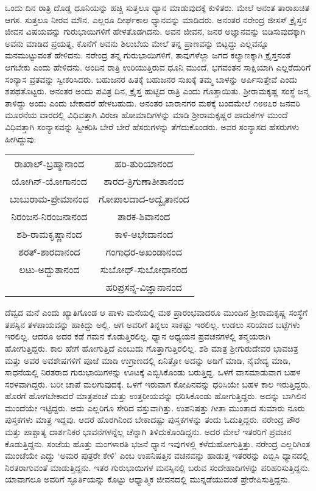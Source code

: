 ಒಂದು ದಿನ ರಾತ್ರಿ ದೊಡ್ಡ ಧೂನಿಯನ್ನು ಹಚ್ಚಿ ಸುತ್ತಲೂ ಧ್ಯಾನ ಮಾಡುವುದಕ್ಕೆ ಕುಳಿತರು. ಮೇಲೆ ಅನಂತ ತಾರಾಖಚಿತ ಆಗಸ. ಸುತ್ತಲೂ ನೀರವ ಮೌನ. ಎಲ್ಲರೂ ದೀರ್ಘಕಾಲ ಧ್ಯಾನವನ್ನು ಮಾಡಿದರು. ಅನಂತರ ನರೇಂದ್ರ ಜೀಸಸ್ ಕ್ರೈಸ್ತನ ಜೀವನ ವಿಷಯವನ್ನು ಗುರುಭಾಯಿಗಳಿಗೆ ಹೇಳತೊಡಗಿದನು. ಅವನ ಜೀವನ, ಜನರ ಅಜ್ಞಾನವನ್ನು ಬಿಡಿಸುವುದಕ್ಕಾಗಿ ಅವನು ಮಾಡಿದ ಪ್ರಯತ್ನ, ಕೊನೆಗೆ ಅವನು ಶಿಲುಬೆಯ ಮೇಲೆ ತನ್ನ ಪ್ರಾಣವನ್ನು ಬಿಟ್ಟದ್ದು ಎಲ್ಲವನ್ನೂ ಮನಮುಟ್ಟುವಂತೆ ಹೇಳಿದನು. ನರೇಂದ್ರ ತನ್ನ ಗುರುಭಾಯಿಗಳಿಗೆ, ತಾವುಗಳೆಲ್ಲಾ ಜಗದ ಕಲ್ಯಾಣಕ್ಕಾಗಿ ಕ್ರೈಸ್ತನಂತೆ ಆಗಬೇಕು ಎಂದು ಹೇಳಿದನು. ಅಂದಿನ ರಾತ್ರಿ ಉರಿಯುತ್ತಿರುವ ಧೂನಿ ಮುಂದೆ, ಭಗವಂತನ ಸಾಕ್ಷಿಯಾಗಿ ಎಲ್ಲರೆದುರಿಗೆ ಸಂನ್ಯಾಸ ವ್ರತವನ್ನು ಸ್ವೀಕರಿಸಿದರು. ಬಹುಜನರ ಹಿತಕ್ಕೆ ಬಹುಜನರ ಸುಖಕ್ಕೆ ತಮ್ಮ ಬಾಳನ್ನು ಅರ್ಪಿಸುತ್ತೇವೆ ಎಂದು ಶಪಥತೊಟ್ಟರು. ಅನಂತರ ಅಂದು ಪವಿತ್ರ ದಿನ, ಕ್ರೈಸ್ತ ಹುಟ್ಟಿದ ರಾತ್ರಿ ಎಂದು ಗೊತ್ತಾಯಿತು. ಶ‍್ರೀರಾಮಕೃಷ್ಣ ಸಂಸ್ಥೆ ಜನ್ಮ ತಾಳಿದ್ದು ಅಂದು ಎಂದು ಬೇಕಾದರೆ ಹೇಳಬಹುದು. ಅನಂತರ ಬಾರಾನಗರ ಮಠಕ್ಕೆ ಬಂದಮೇಲೆ ೧೮೮೭ರ ಜನವರಿ ಮೂರನೆಯ ವಾರದಲ್ಲಿ ವಿಧಿವತ್ತಾಗಿ ವಿರಜಾ ಹೋಮಾದಿಗಳನ್ನು ಮಾಡಿ ಶ‍್ರೀರಾಮಕೃಷ್ಣರ ಪಾದುಕೆಗಳ ಮುಂದೆ ವಿಧಿವತ್ತಾಗಿ ಸಂನ್ಯಾಸವನ್ನು ಸ್ವೀಕರಿಸಿ ಬೇರೆ ಬೇರೆ ಹೆಸರುಗಳನ್ನು ತೆಗೆದುಕೊಂಡರು. ಅವರ ಸಂನ್ಯಾಸದ ಹೆಸರುಗಳು ಹೀಗಿದ್ದುವು:
\begin{center}
\begin{tabular}{cc}
ರಾಖಾಲ್-ಬ್ರಹ್ಮಾನಾಂದ & ಹರಿ-ತುರಿಯಾನಂದ\\
ಯೋಗಿನ್-ಯೋಗಾನಂದ & ಶಾರದ-ತ್ರಿಗುಣಾತೀತಾನಂದ\\
ಬಾಬುರಾಮ-ಪ್ರೇಮಾನಂದ & ಗೋಪಾಲದಾದ-ಅದ್ವೈತಾನಂದ\\
ನಿರಂಜನ-ನಿರಂಜನಾನಂದ & ತಾರಕ-ಶಿವಾನಂದ\\
ಶಶಿ-ರಾಮಕೃಷ್ಣಾನಂದ & ಕಾಳಿ-ಅಭೇದಾನಂದ\\
ಶರತ್-ಶಾರದಾನಂದ & ಗಂಗಾಧರ-ಅಖಂಡಾನಂದ\\
ಲಟು-ಅದ್ಭುತಾನಂದ & ಸುಬೋಧ್-ಸುಬೋಧಾನಂದ\\
 & ಹರಿಪ್ರಸನ್ನ-ವಿಜ್ಞಾನಾನಂದ\\
\end{tabular}
\end{center}

ದೆವ್ವದ ಮನೆ ಎಂದು ಖ್ಯಾತಿಗೊಂಡ ಆ ಪಾಳು ಮನೆಯಲ್ಲಿ ಮಠ ಪ್ರಾರಂಭವಾದರೂ ಮುಂದಿನ ಶ‍್ರೀರಾಮಕೃಷ್ಣ ಸಂಸ್ಥೆಗೆ ತಪಸ್ಸಿನ ತಳಪಾಯವನ್ನು ಹಾಕಿದ್ದು ಅಲ್ಲಿ. ಆಗ ಅವರಿಗೆ ತಿನ್ನಲು ಸಾಕಷ್ಟು ಇರಲಿಲ್ಲ. ಉಡಲು ಸರಿಯಾದ ಬಟ್ಟೆಗಳು ಇರಲಿಲ್ಲ. ಆದರೂ ಅದರ ಕಡೆ ಗಮನ ಕೊಡುತ್ತಿರಲಿಲ್ಲ. ಧ್ಯಾನ ಅಧ್ಯಯನ ಪ್ರವಚನಗಳಲ್ಲಿ ತನ್ಮಯರಾಗಿ ಹೋಗುತ್ತಿದ್ದರು. ಕಾಲ ಹೇಗೆ ಹೋಗುತ್ತಿದೆ ಎಂಬುದು ಗೊತ್ತಾಗುತ್ತಿರಲಿಲ್ಲ. ಶಶಿ ಮಾತ್ರ ಶ‍್ರೀಗುರುದೇವರ ಭಾವಚಿತ್ರ ಮತ್ತು ಅವರ ಅವಶೇಷಗಳಿಗೆ ಪೂಜೆ ಮಾಡಿ ಉಗ್ರಾಣದಲ್ಲಿ ಏನಿತ್ತೋ ಅದನ್ನು ಅಡಿಗೆ ಮಾಡಿ, ನೈವೇದ್ಯ ಮಾಡಿ, ಸಾಧನೆಯಲ್ಲಿ ನಿರತರಾದ ಗುರುಭಾಯಿಗಳನ್ನು ಊಟಕ್ಕೆ ಎಬ್ಬಿಸಿಕೊಂಡು ಬರುತ್ತಿದ್ದ. ಒಳಗೆ ವಾಸಮಾಡುವಾಗ ಬಹಳ ಸರಳವಾಗಿದ್ದರು. ಬರೀ ಚಾಪೆ ಮಲಗುವುದಕ್ಕೆ. ಒಳಗೆ ಇರುವಾಗ ಕೋಪಿನವನ್ನು ಧರಿಸಿಯೇ ಬಹಳ ಕಾಲ ಇರುತ್ತಿದ್ದರು. ಹೊರಗೆ ಹೋಗಬೇಕಾದರೆ ಮಾತ್ರಪಂಚೆ ಮತ್ತು ಉತ್ತರೀಯವನ್ನು ಧರಿಸಿಕೊಂಡು ಹೋಗುತ್ತಿದ್ದರು. ಅದನ್ನು ಬಾಗಿಲಿನ ಮುಂದೆಯೇ ಇಟ್ಟಿದ್ದರು. ಅದು ಎಲ್ಲರಿಗೂ ಸೇರಿದ ವಸ್ತುವಾಗಿತ್ತು. ಉಪನಿಷತ್ತು ಗೀತಾ ಮುಂತಾದ ಸುಮಾರು ನೂರು ಪುಸ್ತಕಗಳು ಮಾತ್ರ ಇದ್ದವು. ಆದರೆ ಹೊರಗಿನಿಂದ ಬೇಕಾದಷ್ಟು ಪುಸ್ತಕಗಳನ್ನು ತಂದು ಓದುತ್ತಿದ್ದರು. ನರೇಂದ್ರ ಪೌರ ಮತ್ತು ಪಾಶ್ಚಾತ್ಯ ದಾರ್ಶನಿಕರ ಭಾವನೆಗಳನ್ನೆಲ್ಲ ಚೆನ್ನಾಗಿ ತಿಳಿದುಕೊಂಡಿದ್ದನು. ಅದರ ಮೇಲೆ ಇತರರಿಗೆ ಪ್ರವಚನ ಕೊಡುತ್ತಿದ್ದನು. ಸಂಜೆಯ ಹೊತ್ತು ಮಂಗಳಾರತಿ ಭಜನೆ ಧ್ಯಾನ ಇವುಗಳಲ್ಲಿ ಕಳೆದುಹೋಗುತ್ತಿತ್ತು. ನರೇಂದ್ರ ಎಲ್ಲರಿಗಿಂತ ಮುಂಚೆಯೇ ಎದ್ದು ‘ಅಮರ ಪುತ್ರರೇ ಕೇಳಿ’ ಎಂಬ ಉಪನಿಷತ್ತಿನ ವಚನವನ್ನು ಹಾಡುತ್ತ ಇತರರನ್ನು ಎಬ್ಬಿಸಿ ಧ್ಯಾನದಲ್ಲಿ ನಿರತರಾಗುವಂತೆ ಮಾಡುತ್ತಿದ್ದನು. ಇತರ ಗುರುಭಾಯಿಗಳ ಮನಸ್ಸಿನಲ್ಲಿ ಬರುವ ಸಂದೇಹಾದಿಗಳನ್ನು ಪರಿಹರಿಸುತ್ತಿದ್ದನು. ಯಾವಾಗಲೂ ಅವರಿಗೆ ಸ್ಫೂರ್ತಿಯನ್ನು ಕೊಟ್ಟು ಆಧ್ಯಾತ್ಮಿಕ ಜೀವನದಲ್ಲಿ ಮುನ್ನಡೆಯುವಂತೆ ಪ್ರೇರೇಪಿಸುತ್ತಿದ್ದನು.

